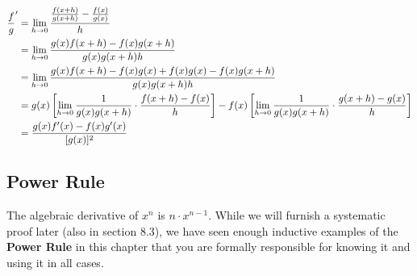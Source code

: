 \begin{align*}
\frac{f}{g}' & = \lim_{h\rightarrow0}\cfrac{\frac{f(x+h)}{g(x+h)}-\frac{f(x)}{g(x)}}{h} \\
	&=  \lim_{h\rightarrow0}\frac{g(x)f(x+h)-f(x)g(x+h)}{g(x)g(x+h)h} \\
	&=  \lim_{h\rightarrow0}\frac{g(x)f(x+h)-f(x)g(x)+f(x)g(x)-f(x)g(x+h)}{g(x)g(x+h)h} \\
	&=  g(x)\left[\lim_{h\rightarrow0}\frac{1}{g(x)g(x+h)}\cdot{}\frac{f(x+h)-f(x)}{h}\right]-f(x)\left[\lim_{h\rightarrow0}\frac{1}{g(x)g(x+h)}\cdot{}\frac{g(x+h)-g(x)}{h}\right] \\
	&= \frac{g(x)f'(x) - f(x)g'(x)}{[g(x)]^2}
\end{align*}

\subsection{Power Rule}
The algebraic derivative of $x^n$ is $n\cdot x^{n-1}$.  While we will furnish a systematic proof 
later (also in section 8.3), we have seen enough inductive
examples of the \textbf{Power Rule} in this chapter
that you are formally responsible for knowing it and using it in all cases.